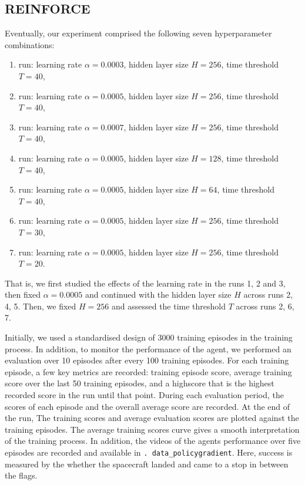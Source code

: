 \documentclass[a4paper, 11pt]{article}
\begin{document}
	\subsection{REINFORCE}
	\label{sec:reinforce}
	Eventually, our experiment comprised the following seven hyperparameter combinations:
	\begin{enumerate}
	 \item run: learning rate $\alpha=0.0003$, hidden layer size $H=256$, time threshold $T=40$,
	 \item run: learning rate $\alpha=0.0005$, hidden layer size $H=256$, time threshold $T=40$,
	 \item run: learning rate $\alpha=0.0007$, hidden layer size $H=256$, time threshold $T=40$,
	 \item run: learning rate $\alpha=0.0005$, hidden layer size $H=128$, time threshold $T=40$,
	 \item run: learning rate $\alpha=0.0005$, hidden layer size $H=64$, time threshold  $T=40$,
	 \item run: learning rate $\alpha=0.0005$, hidden layer size $H=256$, time threshold $T=30$,
	 \item run: learning rate $\alpha=0.0005$, hidden layer size $H=256$, time threshold $T=20$.
	\end{enumerate}
	That is, we first studied the effects of the learning rate in the runs 1, 2 and 3, then fixed $\alpha=0.0005$ and continued with the hidden layer size $H$ across runs 2, 4, 5. Then, we fixed $H=256$ and assessed the time threshold $T$ across runs 2, 6, 7.
	
	Initially, we used a standardised design of 3000 training episodes in the training process. In addition, to monitor the performance of the agent, we performed an evaluation over 10 episodes after every 100 training episodes. 
	For each training episode, a few key metrics are recorded: training episode score, average training score over the last 50 training episodes, and a highscore that is the highest recorded score in the run until that point. During each evaluation period, the scores of each episode and the overall average score are recorded. 
	At the end of the run, The training scores and average evaluation scores are plotted against the training episodes. The average training scores curve gives a smooth interpretation of the training process. In addition, the videos of the agents performance over five episodes are recorded and available in \texttt{.\ data\_policygradient}. Here, success is measured by the whether the spacecraft landed and came to a stop in between the flags.
	
\end{document}
